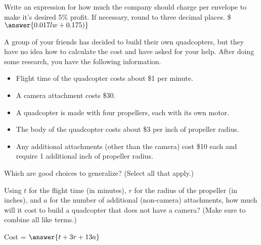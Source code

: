\documentclass{ximera}
\begin{document}
\begin{problem}
\begin{problem}
\begin{problem}
            \begin{problem}
                Write an expression for how much the company should charge per envelope to make it's desired 5\% profit.  If necessary, round to three decimal places. \$$\answer{0.017lw + 0.175)}$
            \end{problem}
        \end{problem}
    \end{problem}
\end{problem}

\begin{problem}
    A group of your friends has decided to build their own quadcopters, but they have no idea how to calculate the cost and have asked for your help.  After doing some research, you have the following information.
    \begin{itemize}
        \item{Flight time of the quadcopter costs about \$1 per minute.}
        \item{A camera attachment costs \$30.}
        \item{A quadcopter is made with four propellers, each with its own motor.}
        \item{The body of the quadcopter costs about \$3 per inch of propeller radius.}
        \item{Any additional attachments (other than the camera) cost \$10 each and require 1 additional inch of propeller radius.}
    \end{itemize}
    Which are good choices to generalize? (Select all that apply.)
    \begin{selectAll}
    \end{selectAll}
    \begin{problem}
        Using $t$ for the flight time (in minutes), $r$ for the radius of the propeller (in inches), and $a$ for the number of additional (non-camera) attachments, how much will it cost to build a quadcopter that does not have a camera? (Make sure to combine all like terms.)

        Cost = $\answer{t + 3r + 13a}$
    \end{problem}

\end{problem}
\end{document}

